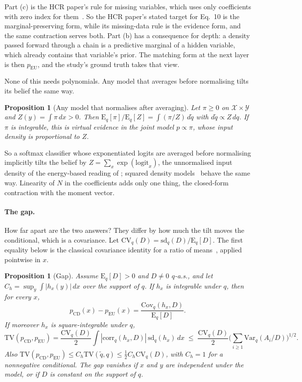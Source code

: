 \documentclass[10pt,a4paper]{article}
\newcommand{\pcd}{p_{\mathrm{CD}}}
\newcommand{\peu}{p_{\mathrm{EU}}}
\newcommand{\Eq}{\mathrm{E}_q}
\newcommand{\Var}{\mathrm{Var}}
\newcommand{\Cov}{\mathrm{Cov}}
\newcommand{\sd}{\mathrm{sd}}
\newcommand{\TV}{\mathrm{TV}}
\newcommand{\CV}{\mathrm{CV}_q}
\theoremstyle{upright}
\newtheorem{proposition}[theorem]{Proposition}
\begin{document}
Part (c) is the HCR paper's rule for missing variables, which uses only coefficients with zero index for them~\citep[Sec.~II-A]{duda2024biology}. So the HCR paper's stated target for Eq.~10 is the marginal-preserving form, while its missing-data rule is the evidence form, and the same contraction serves both. Part (b) has a consequence for depth: a density passed forward through a chain is a predictive marginal of a hidden variable, which already contains that variable's prior. The matching form at the next layer is then $\peu$, and the study's ground truth takes that view.

None of this needs polynomials. Any model that averages before normalising tilts its belief the same way.

\begin{proposition}[Any model that normalises after averaging]\label{prop:any}
Let $\pi\geq0$ on $\mathcal X\times\mathcal Y$ and $Z(y)=\int \pi\,dx>0$. Then
$\Eq[\pi]/\Eq[Z]=\int (\pi/Z)\,d\tilde q$ with $d\tilde q\propto Z\,dq$. If $\pi$ is integrable, this is virtual evidence in the joint model $p\propto \pi$, whose input density is proportional to $Z$.
\end{proposition}

So a softmax classifier whose exponentiated logits are averaged before normalising implicitly tilts the belief by $Z=\sum_x\exp(\text{logit}_x)$, the unnormalised input density of the energy-based reading of \citet{grathwohl2020classifier}; squared density models~\citep{rudi2021psd,tsuchida2023squared} behave the same way. Linearity of $N$ in the coefficients adds only one thing, the closed-form contraction with the moment vector.

\paragraph{The gap.} How far apart are the two answers? They differ by how much the tilt moves the conditional, which is a covariance. Let $\CV(D)=\sd_q(D)/\Eq[D]$. The first equality below is the classical covariance identity for a ratio of means~\citep{hartley1954unbiased,schochet2022design}, applied pointwise in $x$.

\begin{proposition}[Gap]\label{prop:gap}
Assume $\Eq[D]>0$ and $D\neq0$ $q$-a.s., and let $C_h=\sup_y\int|h_x(y)|\,dx$ over the support of $q$. If $h_x$ is integrable under $q$, then for every $x$,
\begin{equation}\label{eq:identity}
\pcd(x)-\peu(x)=\frac{\Cov_q(h_x,D)}{\Eq[D]}.
\end{equation}
If moreover $h_x$ is square-integrable under $q$,
\begin{equation}\label{eq:tvbound}
\TV(\pcd,\peu)=\frac{\CV(D)}2\int|\mathrm{corr}_q(h_x,D)|\,\sd_q(h_x)\,dx\;\leq\;\frac{\CV(D)}2\Big(\sum_{i\geq1}\Var_q(A_i/D)\Big)^{1/2}.
\end{equation}
Also $\TV(\pcd,\peu)\leq C_h\TV(\tilde q,q)\leq\frac12C_h\CV(D)$, with $C_h=1$ for a nonnegative conditional. The gap vanishes if $x$ and $y$ are independent under the model, or if $D$ is constant on the support of $q$.
\end{proposition}
\end{document}
